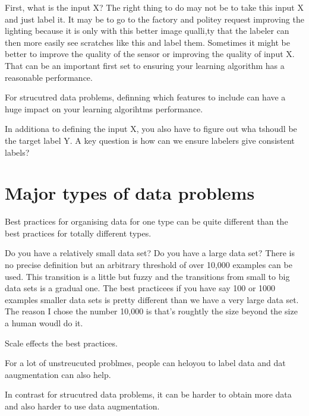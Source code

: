 First, what is the input X?
The right thing to do may not be to take this input X and just label it.
It may be to go to the factory and politey request improving the lighting because it is only with this better image qualli,ty that the labeler can then more easily see scratches like this and label them.
Sometimes it might be better to improve the quality of the sensor or improving the quality of input X.
That can be an important first set to ensuring your learning algorithm has a reasonable performance.

For strucutred data problems, definning which features to include can have a huge impact on your learning algorihtms performance.

In additiona to defining the input X, you also have to figure out wha tshoudl be the target label Y.
A key question is how can we ensure labelers give consistent labels?

\section{Major types of data problems}

Best practices for organising data for one type can be quite different than the best practices for totally different types.


Do you have a relatively small data set?
Do you have a large data set?
There is no precise definition but an arbitrary threshold of over 10,000 examples can be used.
This transition is a little but fuzzy and the transitions from small to big data sets is a gradual one.
The best practicees if you have say 100 or 1000 examples smaller data sets is pretty different than we have a very large data set.
The reason I chose the number 10,000 is that's roughtly the size beyond the size a human woudl do it.

Scale effects the best practices.

For a lot of unstreucuted problmes, people can heloyou to label data and dat aaugmentation can also help.

In contrast for strucutred data problems, it can be harder to obtain more data and also harder to use data augmentation.


